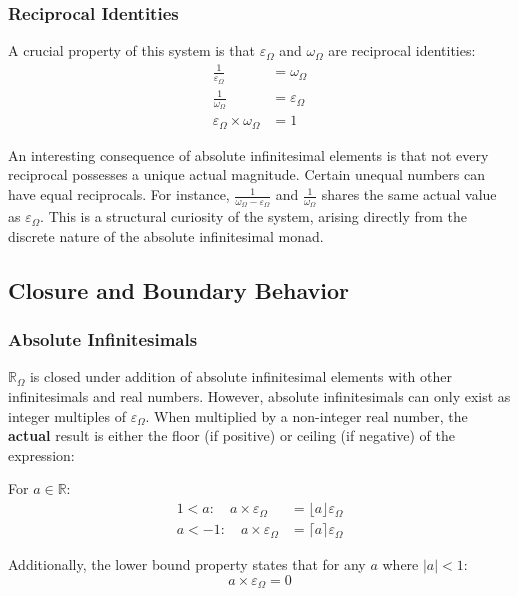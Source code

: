 \documentclass{article}
\begin{document}
\subsubsection{Reciprocal Identities}

A crucial property of this system is that $\varepsilon_\Omega$ and $\omega_\Omega$ are reciprocal identities:
\begin{align*}
\frac{1}{\varepsilon_\Omega} &= \omega_\Omega \\
\frac{1}{\omega_\Omega} &= \varepsilon_\Omega \\
\varepsilon_\Omega \times \omega_\Omega &= 1
\end{align*}

An interesting consequence of absolute infinitesimal elements is that not every reciprocal possesses a unique actual magnitude. Certain unequal numbers can have equal reciprocals. For instance, $\frac{1}{\omega_\Omega - \varepsilon_\Omega}$ and $\frac{1}{\omega_\Omega}$ shares the same actual value as $\varepsilon_\Omega$. This is a structural curiosity of the system, arising directly from the discrete nature of the absolute infinitesimal monad.

\subsection{Closure and Boundary Behavior}

\subsubsection{Absolute Infinitesimals}

$\mathbb{R}_\Omega$ is closed under addition of absolute infinitesimal elements with other infinitesimals and real numbers. However, absolute infinitesimals can only exist as integer multiples of $\varepsilon_\Omega$. When multiplied by a non-integer real number, the \textbf{actual} result is either the floor (if positive) or ceiling (if negative) of the expression:

For $a \in \mathbb{R}$:
\begin{align*}
1 < a: \quad a \times \varepsilon_\Omega &= \lfloor a \rfloor \varepsilon_\Omega \\
a < -1: \quad a \times \varepsilon_\Omega &= \lceil a \rceil \varepsilon_\Omega
\end{align*}

Additionally, the lower bound property states that for any $a$ where $|a| < 1$:
$$a \times \varepsilon_\Omega = 0$$
\end{document}
